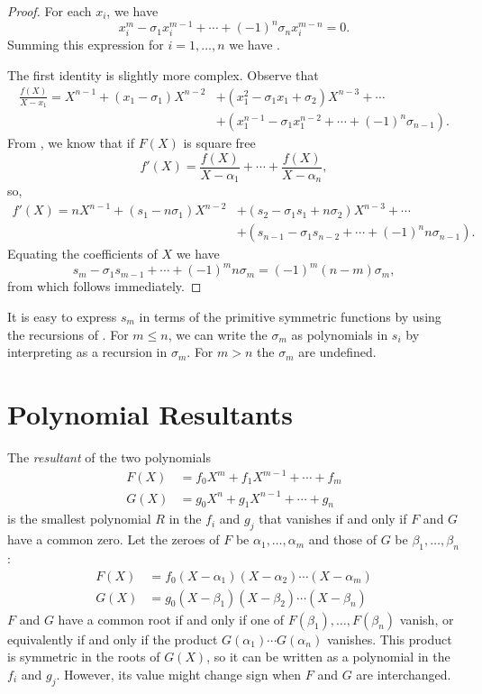 \begin{proof}
For each $x_i$, we have
\[
x_i^m - \sigma_1 x_i^{m-1} + \cdots + (-1)^n \sigma_n x_i^{m -n} = 0.
\]
Summing this expression for $i = 1, \ldots, n$ we have
.

The first identity is slightly more complex.  Observe that
\[
\begin{aligned}
\frac{f(X)}{X-x_1} = X^{n-1} + (x_1 - \sigma_1)X^{n-2} 
  &+ (x_1^2 - \sigma_1 x_1 + \sigma_2) X^{n-3} + \cdots  \\
  &+ (x_1^{n-1} - \sigma_1 x_1^{n-2} + \cdots + (-1)^n\sigma_{n-1}).
\end{aligned}
\]
From , we know that if $F(X)$ is
square free
\[
f'(X) = \frac{f(X)}{X - \alpha_1} + \cdots + \frac{f(X)}{X - \alpha_n},
\]
so,
\[
\begin{aligned}
f'(X) = n X^{n-1} + (s_1 - n \sigma_1)X^{n-2} 
  &+ (s_2 - \sigma_1 s_1 + n \sigma_2) X^{n-3} + \cdots  \\
  &+ (s_{n-1} - \sigma_1 s_{n-2} + \cdots + (-1)^n n \sigma_{n-1}).
\end{aligned}
\]
Equating the coefficients of $X$ we have
\[
s_m - \sigma_1 s_{m-1} + \cdots + (-1)^m n \sigma_m 
  = (-1)^m (n - m) \sigma_m,
\]
from which  follows immediately.
\end{proof}

It is easy to express $s_m$ in terms of the primitive symmetric functions 
by using the recursions of .  For $m \le n$, 
we can write the $\sigma_m$ as polynomials in $s_i$ by interpreting 
 as a recursion in $\sigma_m$.  For $m > n$ 
the $\sigma_m$ are undefined.

\section{Polynomial Resultants}
\label{Poly:Resultant:Sec}
The {\em resultant} of the two polynomials
\[
\begin{aligned}
F(X)&= f_0 X^m + f_1 X^{m-1} + \cdots + f_m\\
G(X)&= g_0 X^n + g_1 X^{n-1} + \cdots + g_n
\end{aligned}
\]
is the smallest polynomial $R$ in the $f_i$ and $g_j$ that vanishes if
and only if $F$ and $G$ have a common zero.  Let the zeroes of $F$ be
$\alpha_1, \ldots, \alpha_m$ and those of $G$ be $\beta_1, \ldots,
\beta_n$:
\[
\begin{aligned}
F(X) &= f_{0}(X - \alpha_{1}) (X - \alpha_{2}) \cdots (X - \alpha_{m}) \\
G(X) &= g_{0}(X - \beta_{1}) (X - \beta_{2}) \cdots (X - \beta_{n})
\end{aligned}
\]
$F$ and $G$ have a common root if and only if one of $F(\beta_1),
\ldots, F(\beta_n)$ vanish, or equivalently if and only if the product
$G(\alpha_1)\cdots G(\alpha_n)$ vanishes.  This product is symmetric in
the roots of $G(X)$, so it can be written as a polynomial in the $f_i$
and $g_j$.  However, its value might change sign when $F$ and $G$ are
interchanged.

